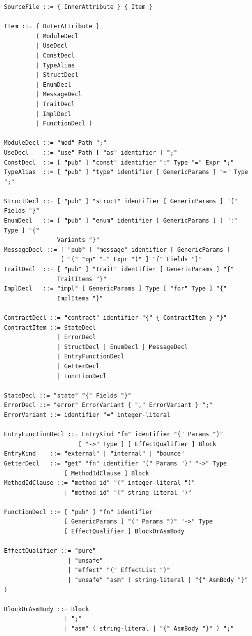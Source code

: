 \documentclass[12pt,oneside]{article}
\begin{document}
\begin{verbatim}
SourceFile ::= { InnerAttribute } { Item }

Item ::= { OuterAttribute }
         ( ModuleDecl
         | UseDecl
         | ConstDecl
         | TypeAlias
         | StructDecl
         | EnumDecl
         | MessageDecl
         | TraitDecl
         | ImplDecl
         | FunctionDecl )

ModuleDecl ::= "mod" Path ";"
UseDecl    ::= "use" Path [ "as" identifier ] ";"
ConstDecl  ::= [ "pub" ] "const" identifier ":" Type "=" Expr ";"
TypeAlias  ::= [ "pub" ] "type" identifier [ GenericParams ] "=" Type ";"

StructDecl ::= [ "pub" ] "struct" identifier [ GenericParams ] "{" Fields "}"
EnumDecl   ::= [ "pub" ] "enum" identifier [ GenericParams ] [ ":" Type ] "{"
               Variants "}"
MessageDecl ::= [ "pub" ] "message" identifier [ GenericParams ]
                [ "(" "op" "=" Expr ")" ] "{" Fields "}"
TraitDecl  ::= [ "pub" ] "trait" identifier [ GenericParams ] "{"
               TraitItems "}"
ImplDecl   ::= "impl" [ GenericParams ] Type [ "for" Type ] "{"
               ImplItems "}"

ContractDecl ::= "contract" identifier "{" { ContractItem } "}"
ContractItem ::= StateDecl
               | ErrorDecl
               | StructDecl | EnumDecl | MessageDecl
               | EntryFunctionDecl
               | GetterDecl
               | FunctionDecl

StateDecl ::= "state" "{" Fields "}"
ErrorDecl ::= "error" ErrorVariant { "," ErrorVariant } ";"
ErrorVariant ::= identifier "=" integer-literal

EntryFunctionDecl ::= EntryKind "fn" identifier "(" Params ")"
                     [ "->" Type ] [ EffectQualifier ] Block
EntryKind    ::= "external" | "internal" | "bounce"
GetterDecl   ::= "get" "fn" identifier "(" Params ")" "->" Type
                 [ MethodIdClause ] Block
MethodIdClause ::= "method_id" "(" integer-literal ")"
                 | "method_id" "(" string-literal ")"

FunctionDecl ::= [ "pub" ] "fn" identifier
                 [ GenericParams ] "(" Params ")" "->" Type
                 [ EffectQualifier ] BlockOrAsmBody

EffectQualifier ::= "pure"
                  | "unsafe"
                  | "effect" "(" EffectList ")"
                  | "unsafe" "asm" ( string-literal | "{" AsmBody "}" )

BlockOrAsmBody ::= Block
                 | ";"
                 | "asm" ( string-literal | "{" AsmBody "}" ) ";"


\end{verbatim}
\end{document}
